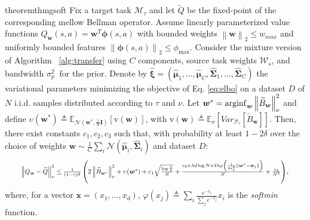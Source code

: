 \documentclass{article}
\newcommand{\arginf}{\operatornamewithlimits{arginf}}
\newcommand{\wt}[1]{\widetilde{#1}}
\newcommand{\wh}[1]{\widehat{#1}}
\newcommand{\norm}[1]{\left\lVert #1 \right\rVert}
\begin{document}
\begin{restatable}{theorem}{thmgsoft} \label{th:main-mixture-soft}
Fix a target task $\mathcal{M}_{\tau}$ and let $\wt{Q}$ be the fixed-point of the corresponding mellow Bellman operator. Assume linearly parameterized value functions $Q_{\bm{w}}(s,a)=\bm{w}^T\bm{\phi}(s,a)$ with bounded weights $\norm{\bm{w}}_2\leq w_{max}$ and uniformly bounded features $\norm{\bm{\phi}(s,a)}_2\leq \phi_{\max}$. Consider the mixture version of Algorithm~ \ref{alg:transfer} using $C$ components, source task weights $\mathcal{W}_s$, and bandwidth $\sigma^2_p\ $ for the prior. Denote by $\wh{\bm{\xi}} = (\wh{\bm{\mu}}_1,\dots,\wh{\bm{\mu}}_C,\wh{\bm{\Sigma}}_1,\dots,\wh{\bm{\Sigma}}_C)$ the variational parameters minimizing the objective of Eq. \eqref{eq:elbo} on a dataset $D$ of $N$ i.i.d. samples distributed according to $\tau$ and $\nu$. Let $\bm{w}^* = \arginf_{\bm{w}}\norm{\wt{B}_{\bm{w}}}_{\nu}^2$ and define $\upsilon(\bm{w}^*) \triangleq \mathbb{E}_{\mathcal{N}(\bm{w}^*,\frac{1}{N}\bm{I})}\left[ \text{v}(\bm{w}) \right]$, with $\text{v}(\bm{w}) \triangleq \mathbb{E}_{\nu}\left[Var_{\mathcal{P}_{\tau}}\left[\wt B_{\bm{w}}\right]\right]$. Then, there exist constants $c_1,c_2,c_3$ such that, with probability at least $1-2\delta$ over the choice of weights $\bm{w} \sim \frac{1}{C}\sum_i\mathcal{N}(\wh{\bm{\mu}}_i,\wh{\bm{\Sigma}}_i)$ and dataset $D$:
\begin{equation}
\resizebox{0.92\textwidth}{!}{$
\norm{Q_{\bm{w}} - \wt{Q}}_{\nu}^2 \leq \frac{1}{(1-\gamma)\delta}\left(2\norm{\wt{B}_{\bm{w}^{*}}}_{\nu}^2 + \upsilon(\bm{w}^*) + c_1\sqrt{\frac{\log\frac{2}{\delta}}{N}}  + \frac{c_2 +  \lambda d \log N + 2\lambda\varphi\left(\frac{1}{2\sigma^2_p}\norm{\bm{w}^* - \bm{w}_j}\right)}{N} + \frac{c_3}{N^2}\right)$},
\end{equation}
where, for a vector $\bm{x} = (x_1,\dots,x_d)$, $\varphi \left( x_j\right) \triangleq \sum_i \frac{e^{-x_i}}{\sum_j e^{-x_j}}x_i$ is the \textit{softmin} function.
\end{restatable}
\end{document}
